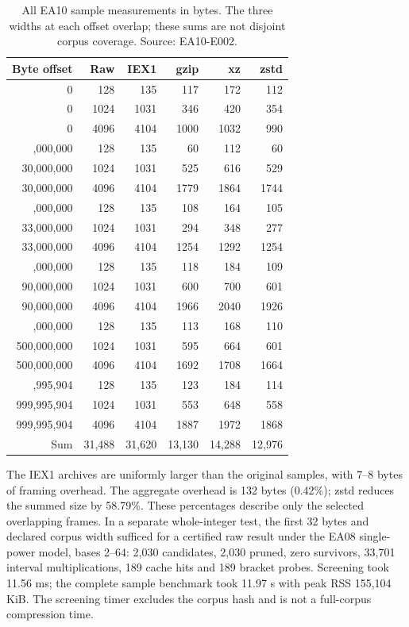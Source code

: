 \documentclass[11pt,a4paper]{article}
\begin{document}
\begin{table}[htbp]
\centering\small
\begin{tabular}{@{}rrrrrr@{}}\toprule
Byte offset & Raw & IEX1 & gzip & xz & zstd\\\midrule
0 & 128 & 135 & 117 & 172 & 112\\
0 & 1024 & 1031 & 346 & 420 & 354\\
0 & 4096 & 4104 & 1000 & 1032 & 990\\\addlinespace
30,000,000 & 128 & 135 & 60 & 112 & 60\\
30,000,000 & 1024 & 1031 & 525 & 616 & 529\\
30,000,000 & 4096 & 4104 & 1779 & 1864 & 1744\\\addlinespace
33,000,000 & 128 & 135 & 108 & 164 & 105\\
33,000,000 & 1024 & 1031 & 294 & 348 & 277\\
33,000,000 & 4096 & 4104 & 1254 & 1292 & 1254\\\addlinespace
90,000,000 & 128 & 135 & 118 & 184 & 109\\
90,000,000 & 1024 & 1031 & 600 & 700 & 601\\
90,000,000 & 4096 & 4104 & 1966 & 2040 & 1926\\\addlinespace
500,000,000 & 128 & 135 & 113 & 168 & 110\\
500,000,000 & 1024 & 1031 & 595 & 664 & 601\\
500,000,000 & 4096 & 4104 & 1692 & 1708 & 1664\\\addlinespace
999,995,904 & 128 & 135 & 123 & 184 & 114\\
999,995,904 & 1024 & 1031 & 553 & 648 & 558\\
999,995,904 & 4096 & 4104 & 1887 & 1972 & 1868\\\midrule
Sum & 31,488 & 31,620 & 13,130 & 14,288 & 12,976\\\bottomrule
\end{tabular}
\caption{All EA10 sample measurements in bytes. The three widths at each offset overlap; these sums are not disjoint corpus coverage. Source: EA10-E002.}
\label{tab:corpus}
\end{table}

The IEX1 archives are uniformly larger than the original samples, with 7--8 bytes of framing overhead. The aggregate overhead is 132 bytes (0.42\%); zstd reduces the summed size by 58.79\%. These percentages describe only the selected overlapping frames. In a separate whole-integer test, the first 32 bytes and declared corpus width sufficed for a certified raw result under the EA08 single-power model, bases 2--64: 2,030 candidates, 2,030 pruned, zero survivors, 33,701 interval multiplications, 189 cache hits and 189 bracket probes. Screening took 11.56 ms; the complete sample benchmark took 11.97 s with peak RSS 155,104 KiB. The screening timer excludes the corpus hash and is not a full-corpus compression time.
\end{document}
